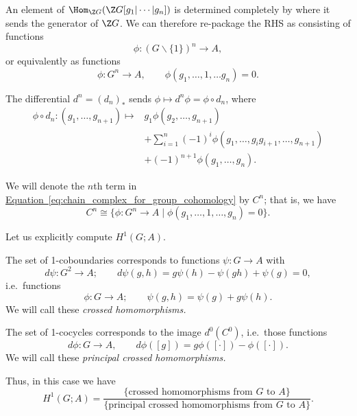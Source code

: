 \documentclass[main.tex]{subfiles}
\begin{document}
An element of $\Hom_{\Z G}(\Z G[g_{1}|\cdots|g_{n}])$ is determined completely by where it sends the generator of $\Z G$. We can therefore re-package the RHS as consisting of functions
\begin{equation*}
  \phi\colon (G\smallsetminus\{1\})^{n} \to A,
\end{equation*}
or equivalently as functions
\begin{equation*}
  \phi\colon G^{n} \to A,\qquad \phi(g_{1}, \ldots, 1, \ldots g_{n}) = 0.
\end{equation*}

The differential $d^{n} = (d_{n})_{*}$ sends $\phi \mapsto d^{n} \phi = \phi \circ d_{n}$, where
\begin{align*}
  \phi \circ d_{n}\colon (g_{1}, \ldots, g_{n+1}) \mapsto & g_{1}\phi(g_{2}, \ldots, g_{n+1}) \\
  &+ \sum_{i = 1}^{n} (-1)^{i} \phi(g_{1}, \ldots, g_{i}g_{i+1}, \ldots, g_{n+1}) \\
  &+ (-1)^{n+1}\phi(g_{1}, \ldots, g_{n}).
\end{align*}

We will denote the $n$th term in \hyperref[eq:chain_complex_for_group_cohomology]{Equation~\ref*{eq:chain_complex_for_group_cohomology}} by $C^{n}$; that is, we have
\begin{equation*}
  C^{n} \cong \{\phi\colon G^{n} \to A\mid \phi(g_{1}, \ldots, 1, \ldots, g_{n}) = 0\}.
\end{equation*}

Let us explicitly compute $H^{1}(G; A)$.

The set of 1-coboundaries corresponds to functions $\psi\colon G \to A$ with
\begin{equation*}
  d\psi\colon G^{2} \to A;\qquad d\psi(g,h) = g\psi(h) - \psi(gh) + \psi(g) = 0,
\end{equation*}
i.e.\ functions
\begin{equation*}
  \phi\colon G \to A;\qquad \psi(g, h) = \psi(g) + g\psi(h).
\end{equation*}
We will call these \emph{crossed homomorphisms.}

The set of 1-cocycles corresponds to the image $d^{0}(C^{0})$, i.e.\ those functions
\begin{equation*}
  d\phi\colon G \to A,\qquad d\phi([g]) = g\phi([\cdot]) - \phi([\cdot]).
\end{equation*}
We will call these \emph{principal crossed homomorphisms.}

Thus, in this case we have
\begin{equation*}
  H^{1}(G; A) = \frac{\{\text{crossed homomorphisms from $G$ to $A$}\}}{\text{\{principal crossed homomorphisms from $G$ to $A$\}}}.
\end{equation*}
\end{document}
